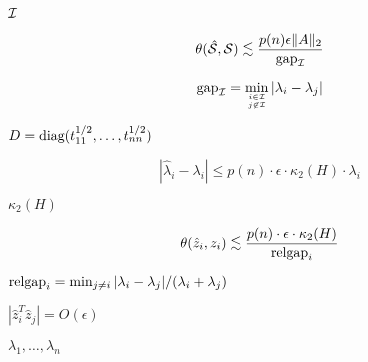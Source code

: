 {\newpage\clearpage
{}%
$\cal I$%
\lthtmlinlinemathZ
\lthtmlcheckvsize\clearpage}

{\newpage\clearpage
{}%
\begin{displaymath}
\theta ( {\hat{\cal S}}, {\cal S}) \mathrel{\raisebox{-.75ex}{$\mathop{\sim}\limits^{\textstyle <}$}}\frac{p(n) \epsilon \|A\|_2}
{{\rm gap}_{\cal I}}
\end{displaymath}%
\lthtmldisplayZ
\lthtmlcheckvsize\clearpage}

{\newpage\clearpage
{}%
\begin{displaymath}
{\rm gap}_{\cal I} = \min_{i \in {\cal I} \atop j \not\in {\cal I}}
| \lambda_i - \lambda_j |
\end{displaymath}%
\lthtmldisplayZ
\lthtmlcheckvsize\clearpage}

{\newpage\clearpage
{}%
$D = {\mbox {\rm diag}}( t_{11}^{1/2} , \ldots , t_{nn}^{1/2})$%
\lthtmlinlinemathZ
\lthtmlcheckvsize\clearpage}

{\newpage\clearpage
{}%
\begin{displaymath}
| \hat{\lambda}_i - \lambda_i | \leq p(n) \cdot \epsilon \cdot \kappa_2(H)
\cdot \lambda_i
\end{displaymath}%
\lthtmldisplayZ
\lthtmlcheckvsize\clearpage}

{\newpage\clearpage
{}%
$\kappa_2 (H)$%
\lthtmlinlinemathZ
\lthtmlcheckvsize\clearpage}

{\newpage\clearpage
{}%
\begin{displaymath}
\theta ( \hat{z}_i , z_i ) \mathrel{\raisebox{-.75ex}{$\mathop{\sim}\limits^{\textstyle <}$}}\frac{p(n) \cdot \epsilon \cdot \kappa_2 (H)}
{{\rm relgap}_i}
\end{displaymath}%
\lthtmldisplayZ
\lthtmlcheckvsize\clearpage}

{\newpage\clearpage
{}%
${\rm relgap}_i = \min_{j \neq i} | \lambda_i - \lambda_j |/ ( \lambda_i + \lambda_j )$%
\lthtmlinlinemathZ
\lthtmlcheckvsize\clearpage}

{\newpage\clearpage
{}%
$| \hat{z}_i^T \hat{z}_j | = O( \epsilon )$%
\lthtmlinlinemathZ
\lthtmlcheckvsize\clearpage}

{\newpage\clearpage
{}%
$\lambda_1, \ldots , \lambda_n$%
\lthtmlinlinemathZ
\lthtmlcheckvsize\clearpage}

